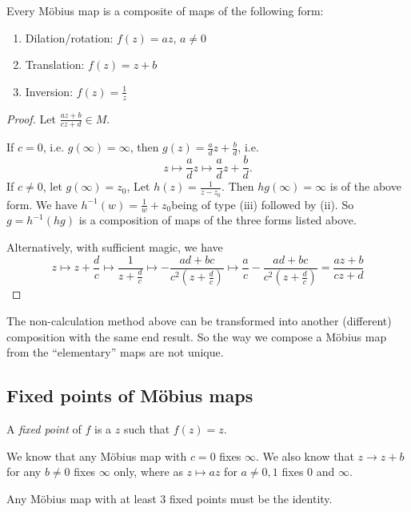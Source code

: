 \documentclass[a4paper]{article}
\begin{document}
  \begin{prop}
    Every M\"obius map is a composite of maps of the following form:
    \begin{enumerate}
      \item Dilation/rotation: $f(z) = az$, $a\not= 0$
      \item Translation: $f(z) = z + b$
      \item Inversion: $f(z) = \frac{1}{z}$
    \end{enumerate}
  \end{prop}
  \begin{proof}
    Let $\frac{az + b}{cz + d}\in M$.

    If $c = 0$, i.e. $g(\infty) = \infty$, then $g(z) = \frac{a}{d}z + \frac{b}{d}$, i.e.
    \[
      z\mapsto \frac{a}{d} z\mapsto \frac{a}{d}z + \frac{b}{d}.
    \]
    If $c\not= 0$, let $g(\infty)=z_0$, Let $h(z) = \frac{1}{z - z_0}$. Then $hg(\infty) = \infty$ is of the above form. We have $h^{-1}(w) = \frac{1}{w} + z_0$being of type (iii) followed by (ii). So $g = h^{-1} (hg)$ is a composition of maps of the three forms listed above.

    Alternatively, with sufficient magic, we have
    \[
      z\mapsto z + \frac{d}{c} \mapsto \frac{1}{z + \frac{d}{c}} \mapsto -\frac{ad + bc}{c^2(z + \frac{d}{c})}\mapsto \frac{a}{c} -\frac{ad + bc}{c^2(z + \frac{d}{c})} = \frac{az + b}{cz + d}
    \]
  \end{proof}
  \note The non-calculation method above can be transformed into another (different) composition with the same end result. So the way we compose a M\"obius map from the ``elementary'' maps are not unique.

  \subsection{Fixed points of M\"obius maps}
  \begin{defi}
    A \emph{fixed point} of $f$ is a $z$ such that $f(z) = z$.
  \end{defi}

  We know that any M\"obius map with $c = 0$ fixes $\infty$. We also know that $z\to z + b$ for any $b\not= 0$ fixes $\infty$ only, where as $z\mapsto az$ for $a\not= 0, 1$ fixes $0$ and $\infty$.

  \begin{prop}
    Any M\"obius map with at least 3 fixed points must be the identity. 
  \end{prop}
\end{document}
